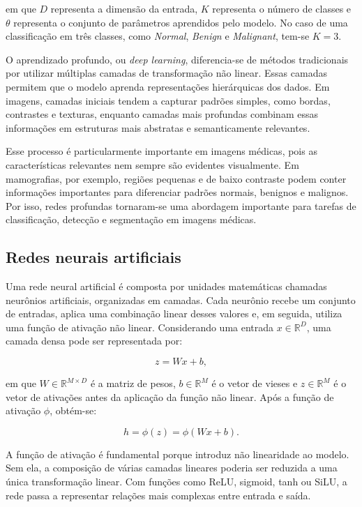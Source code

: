 \documentclass[
    12pt,
    openright,
    oneside,
    a4paper,
    english,
    brazil
]{abntex2}
\begin{document}
em que \(D\) representa a dimensão da entrada, \(K\) representa o número de classes e \(\theta\) representa o conjunto de parâmetros aprendidos pelo modelo. No caso de uma classificação em três classes, como \textit{Normal}, \textit{Benign} e \textit{Malignant}, tem-se \(K=3\).

O aprendizado profundo, ou \textit{deep learning}, diferencia-se de métodos tradicionais por utilizar múltiplas camadas de transformação não linear. Essas camadas permitem que o modelo aprenda representações hierárquicas dos dados. Em imagens, camadas iniciais tendem a capturar padrões simples, como bordas, contrastes e texturas, enquanto camadas mais profundas combinam essas informações em estruturas mais abstratas e semanticamente relevantes.

Esse processo é particularmente importante em imagens médicas, pois as características relevantes nem sempre são evidentes visualmente. Em mamografias, por exemplo, regiões pequenas e de baixo contraste podem conter informações importantes para diferenciar padrões normais, benignos e malignos. Por isso, redes profundas tornaram-se uma abordagem importante para tarefas de classificação, detecção e segmentação em imagens médicas.

\subsection{Redes neurais artificiais}

Uma rede neural artificial é composta por unidades matemáticas chamadas neurônios artificiais, organizadas em camadas. Cada neurônio recebe um conjunto de entradas, aplica uma combinação linear desses valores e, em seguida, utiliza uma função de ativação não linear. Considerando uma entrada \(x \in \mathbb{R}^{D}\), uma camada densa pode ser representada por:

\[
z = Wx + b,
\]

em que \(W \in \mathbb{R}^{M \times D}\) é a matriz de pesos, \(b \in \mathbb{R}^{M}\) é o vetor de vieses e \(z \in \mathbb{R}^{M}\) é o vetor de ativações antes da aplicação da função não linear. Após a função de ativação \(\phi\), obtém-se:

\[
h = \phi(z) = \phi(Wx + b).
\]

A função de ativação é fundamental porque introduz não linearidade ao modelo. Sem ela, a composição de várias camadas lineares poderia ser reduzida a uma única transformação linear. Com funções como ReLU, sigmoid, tanh ou SiLU, a rede passa a representar relações mais complexas entre entrada e saída.
\end{document}
